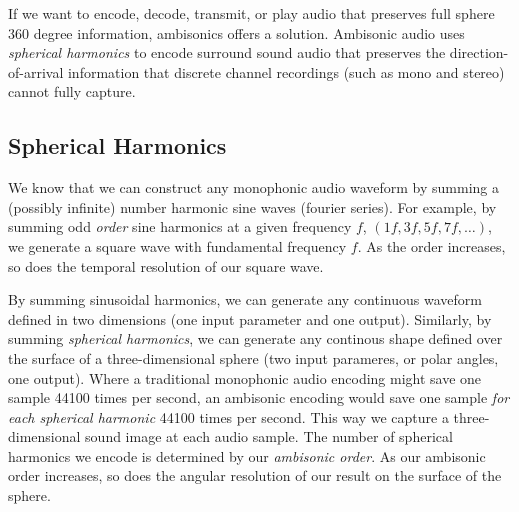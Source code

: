 If we want to encode, decode, transmit, or play audio that preserves
full sphere 360 degree information, ambisonics offers a solution.
Ambisonic audio uses \textit{spherical harmonics} to encode surround
sound audio that preserves the direction-of-arrival information that
discrete channel recordings (such as mono and stereo) cannot fully
capture.

\subsection{Spherical Harmonics}
\label{sec:spherical-harmonics}
We know that we can construct any monophonic audio waveform by summing
a (possibly infinite) number harmonic sine waves (fourier
series).
For example, by summing odd \textit{order} sine harmonics at a given
frequency $f$, $(1f, 3f, 5f, 7f, \ldots )$, we generate a square wave with
fundamental frequency $f$. As the order increases, so does the
temporal resolution of our square wave.

By summing sinusoidal harmonics, we can generate any continuous
waveform defined in two dimensions (one input parameter and one
output). Similarly, by summing \emph{spherical harmonics}, we can
generate any continous shape defined over the surface of a
three-dimensional sphere (two input parameres, or polar angles, one
output). Where a traditional monophonic audio encoding might save one
sample 44100 times per second, an ambisonic encoding would save one
sample \emph{for each spherical harmonic} 44100 times per second. This
way we capture a three-dimensional sound image at each audio sample.
The number of spherical harmonics we encode is determined by our
\textit{ambisonic order}. As our ambisonic order increases, so does
the angular resolution of our result on the surface of the sphere.


